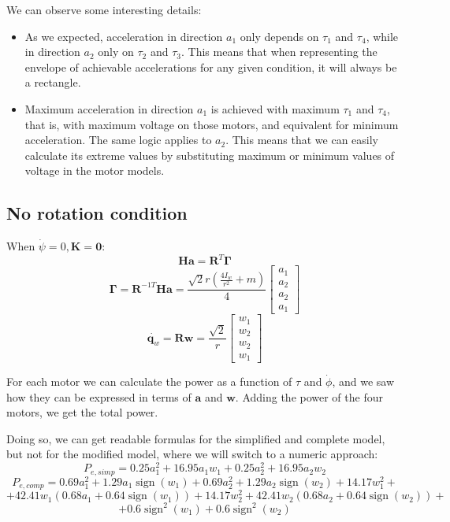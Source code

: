 \documentclass[12pt]{article}
\renewcommand{\vec}[1]{\bm{#1}}
\newcommand{\R}{\mathbb R}
\newcommand{\w}{\dot\varphi}
\def\R{\vec R}
\def\q{\vec q}
\begin{document}
We can observe some interesting details:
\begin{itemize}
	\item As we expected, acceleration in direction $a_1$ only depends on $\tau_1$ and $\tau_4$, while in direction $a_2$ only on $\tau_2$ and $\tau_3$. This means that when representing the envelope of achievable accelerations for any given condition, it will always be a rectangle.
	\item Maximum acceleration in direction $a_1$ is achieved with maximum $\tau_1$ and $\tau_4$, that is, with maximum voltage on those motors, and equivalent for minimum acceleration. The same logic applies to $a_2$. This means that we can easily calculate its extreme values by substituting maximum or minimum values of voltage in the motor models.
\end{itemize}
\subsection*{No rotation condition}
When $\dot\psi = 0, \vec K =\vec 0$:
$$ \vec H\vec a = \R^T\vec \Gamma$$
$$\vec \Gamma = \R^{-1T}\vec H\vec a = \frac{\sqrt{2} r \left(\frac{4 I_{w}}{r^{2}} + m\right)}{4}\left[\begin{matrix}a_{1} \\a_{2} \\a_{2} \\a_{1} \end{matrix}\right]$$
$$\dot{\q_w} = \R \vec{w} = \frac{\sqrt{2}}{r} \left[\begin{matrix}w_1\\w_2\\w_2\\w_1\end{matrix}\right]$$

For each motor we can calculate the power as a function of $\tau$ and $\dot\phi$, and we saw how they can be expressed in terms of $\vec a$ and $\vec w$. Adding the power of the four motors, we get the total power.

Doing so, we can get readable formulas for the simplified and complete model, but not for the modified model, where we will switch to a numeric approach:
$$P_{e, simp} = 0.25 a_{1}^{2} + 16.95 a_{1} w_{1} + 0.25 a_{2}^{2} + 16.95 a_{2} w_{2}$$
$$P_{e, comp} = 0.69 a_{1}^{2} + 1.29 a_{1} \operatorname{sign}\left(w_{1}\right) + 0.69 a_{2}^{2} + 1.29 a_{2} \operatorname{sign}\left(w_{2}\right) + 14.17 w_{1}^{2} +$$
$$+ 42.41 w_{1} \left(0.68 a_{1} + 0.64 \operatorname{sign}\left(w_{1}\right)\right) + 14.17 w_{2}^{2} + 42.41 w_{2} \left(0.68 a_{2} + 0.64 \operatorname{sign}\left(w_{2}\right)\right) +$$
$$+ 0.6 \operatorname{sign}^{2}\left(w_{1}\right) + 0.6 \operatorname{sign}^{2}\left(w_{2}\right)$$
\end{document}
